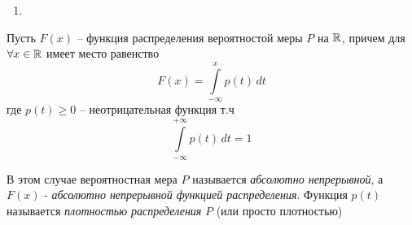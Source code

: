 
\begin{enumerate}[label=\protect\circled{\arabic*},series=distributions,start=2]
	\item {}
\end{enumerate}

\begin{definition}
	Пусть $F(x)$ -- функция распределения вероятностой меры $P$ на $\mathbb{R}$, 
	причем для $\forall x \in \mathbb{R}$
	имеет место равенство
	\begin{equation*}
		F(x) = \int\limits_{-\infty}^{x} p(t)\, dt
	\end{equation*}
	где $p(t) \geq 0$ -- неотрицательная функция т.ч
	\begin{equation*}
		 \int\limits_{-\infty}^{+\infty} p(t)\, dt = 1
	\end{equation*}
	
	В этом случае вероятностная мера $P$ называется \emph{абсолютно непрерывной}, 
	а $F(x)$ - \emph{абсолютно непрерывной функцией распределения}.
	Функция $p(t)$ называется \emph{плотностью распределения} $P$ (или просто плотностью)
\end{definition}

